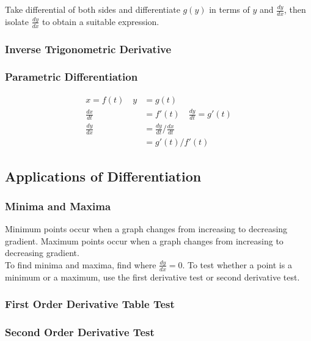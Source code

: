 \documentclass[../main]{subfiles}
\begin{document}
	Take differential of both sides and differentiate \(g(y)\) in terms of \(y\) and \(\frac{dy}{dx}\), then isolate \(\frac{dy}{dx}\) to obtain a suitable expression.

	\subsubsection{Inverse Trigonometric Derivative}

	\subsubsection{Parametric Differentiation}

	\begin{equation*} \begin{aligned}
		x = f(t) \quad y &= g(t) \\
		\frac{dx}{dt} &= f'(t) \quad \frac{dy}{dt} = g'(t)  \\
		\frac{dy}{dx} &= \frac{dy}{dt} / \frac{dx}{dt} \\
		&= g'(t) / f'(t) 
	\end{aligned} \end{equation*}

\subsection{Applications of Differentiation}

	\subsubsection{Minima and Maxima}

	Minimum points occur when a graph changes from increasing to decreasing gradient. Maximum points occur when a graph changes from increasing to decreasing gradient. \\

	To find minima and maxima, find where \(\frac{dy}{dx} = 0 \). To test whether a point is a minimum or a maximum, use the first derivative test or second derivative test.

	\subsubsection{First Order Derivative Table Test}

	\subsubsection{Second Order Derivative Test}
\end{document}

